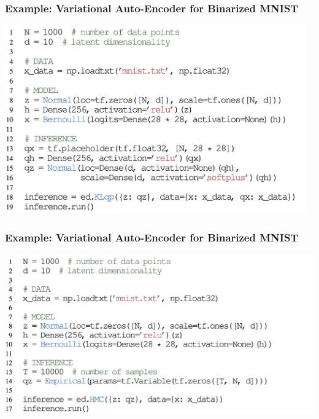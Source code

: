 \documentclass[10pt,
               xcolor={usenames,dvipsnames},
               hyperref={colorlinks,linktoc=all,citecolor=Plum,linkcolor=MidnightBlue,urlcolor=MidnightBlue},noamssymb]{beamer}
\begin{document}
\begin{frame}[t]
\frametitle{Example: Variational Auto-Encoder for Binarized MNIST}
\vspace{5ex}
\begin{center}
\includegraphics[width=0.975\textwidth]{img/vae_example.png}
\end{center}
\end{frame}

\begin{frame}[t]
\frametitle{Example: Variational Auto-Encoder for Binarized MNIST}
\vspace{2.5ex}
\begin{center}
\includegraphics[width=1.05\textwidth]{img/vae_example_hmc.png}
\end{center}
\end{frame}
\end{document}
